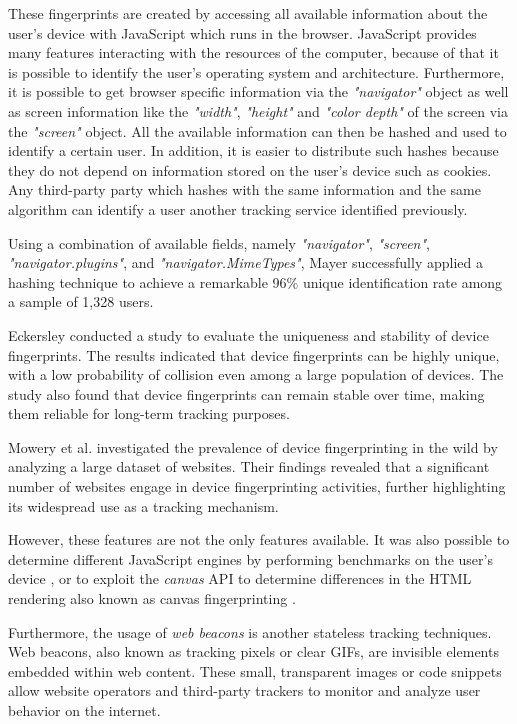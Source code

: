 These fingerprints are created by accessing all available information about the user's device with JavaScript which runs in the browser.
JavaScript provides many features interacting with the resources of the computer, because of that it is possible to identify the user's 
operating system and architecture. Furthermore, it is possible to get browser specific information via the \emph{"navigator"} object as well as 
screen information like the \emph{"width"}, \emph{"height"} and \emph{"color depth"} of the screen via the \emph{"screen"} object. All the available 
information can then be hashed and used to identify a certain user. In addition, it is easier to distribute such hashes because they do not depend 
on information stored on the user's device such as cookies. Any third-party party which hashes with the same information and the same algorithm 
can identify a user another tracking service identified previously.

Using a combination of available fields, namely \emph{"navigator"}, \emph{"screen"}, \emph{"navigator.plugins"}, and \emph{"navigator.MimeTypes"},
Mayer \cite{mayer2009any} successfully applied a hashing technique to achieve a remarkable 96\% unique identification rate among
a sample of 1,328 users.

Eckersley \cite{eckersley2010unique} conducted a study to evaluate the uniqueness and stability of
device fingerprints. The results indicated that device fingerprints can be highly unique,
with a low probability of collision even among a large population of devices. The study also found
that device fingerprints can remain stable over time, making them reliable for long-term tracking purposes.

Mowery et al. \cite{mowery2011fingerprinting} investigated the prevalence of device fingerprinting
in the wild by analyzing a large dataset of websites. Their findings revealed that a significant
number of websites engage in device fingerprinting activities, further highlighting its widespread
use as a tracking mechanism.

However, these features are not the only features available. It was also possible to determine different JavaScript engines by 
performing benchmarks on the user's device \cite{miyazaki2008online}, or to exploit the \emph{canvas} API to determine differences 
in the HTML rendering also known as canvas fingerprinting \cite{mowery2012pixel}.

Furthermore, the usage of \emph{web beacons} is another stateless tracking techniques.
Web beacons, also known as tracking pixels or clear GIFs, are invisible elements embedded within web content.
These small, transparent images or code snippets allow website operators and third-party trackers to monitor
and analyze user behavior on the internet.

